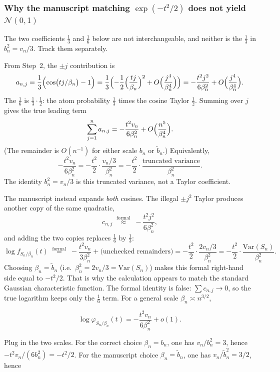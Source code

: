 \documentclass[11pt,a4paper]{article}
\begin{document}
\subsubsection{Why the manuscript matching \(\exp(-t^{2}/2)\) does not yield \(\mathcal{N}(0,1)\)}

The two coefficients \(\frac13\) and \(\frac16\) below are not interchangeable, and neither is the \(\frac13\) in \(b_{n}^{2}=v_{n}/3\). Track them separately.

From Step~2, the \(\pm j\) contribution is
\[
a_{n,j}
=
\frac13\Bigl(\cos\bigl(tj/\beta_{n}\bigr)-1\Bigr)
=
\frac13\Bigl(-\frac12\Bigl(\frac{tj}{\beta_{n}}\Bigr)^{2}+O\Bigl(\frac{j^{4}}{\beta_{n}^{4}}\Bigr)\Bigr)
=
-\frac{t^{2}j^{2}}{6\beta_{n}^{2}}
+
O\Bigl(\frac{j^{4}}{\beta_{n}^{4}}\Bigr).
\]
The \(\frac16\) is \(\frac13\cdot\frac12\): the atom probability \(\frac13\) times the cosine Taylor \(\frac12\). Summing over \(j\) gives the true leading term
\[
\sum_{j=1}^{n}a_{n,j}
=
-\frac{t^{2}v_{n}}{6\beta_{n}^{2}}
+
O\Bigl(\frac{n^{5}}{\beta_{n}^{4}}\Bigr).
\]
(The remainder is \(O(n^{-1})\) for either scale \(b_{n}\) or \(\tilde{b}_{n}\).) Equivalently,
\[
-\frac{t^{2}v_{n}}{6\beta_{n}^{2}}
=
-\frac{t^{2}}{2}\cdot\frac{v_{n}/3}{\beta_{n}^{2}}
=
-\frac{t^{2}}{2}\cdot\frac{\text{truncated variance}}{\beta_{n}^{2}}.
\]
The identity \(b_{n}^{2}=v_{n}/3\) is this truncated variance, not a Taylor coefficient.

The manuscript instead expands \emph{both} cosines. The illegal \(\pm j^{2}\) Taylor produces another copy of the same quadratic,
\[
c_{n,j}
\;\stackrel{\mathrm{formal}}{\approx}\;
-\frac{t^{2}j^{2}}{6\beta_{n}^{2}},
\]
and adding the two copies replaces \(\frac16\) by \(\frac13\):
\[
\log f_{S_{n}/\beta_{n}}(t)
\;\stackrel{\mathrm{formal}}{=}\;
-\frac{t^{2}v_{n}}{3\beta_{n}^{2}}
+
\text{(unchecked remainders)}
=
-\frac{t^{2}}{2}\cdot\frac{2v_{n}/3}{\beta_{n}^{2}}
=
-\frac{t^{2}}{2}\cdot\frac{\mathrm{Var}(S_{n})}{\beta_{n}^{2}}.
\]
Choosing \(\beta_{n}=\tilde{b}_{n}\) (i.e.\ \(\beta_{n}^{2}=2v_{n}/3=\mathrm{Var}(S_{n})\)) makes this formal right-hand side equal to \(-t^{2}/2\). That is why the calculation appears to match the standard Gaussian characteristic function. The formal identity is false: \(\sum c_{n,j}\to 0\), so the true logarithm keeps only the \(\frac16\) term. For a general scale \(\beta_{n}\asymp n^{3/2}\),

\[
\log\varphi_{S_{n}/\beta_{n}}(t)
=
-\frac{t^{2}v_{n}}{6\beta_{n}^{2}}
+
o(1).
\]

Plug in the two scales. For the correct choice \(\beta_{n}=b_{n}\), one has \(v_{n}/b_{n}^{2}=3\), hence \(-t^{2}v_{n}/(6b_{n}^{2})=-t^{2}/2\). For the manuscript choice \(\beta_{n}=\tilde{b}_{n}\), one has \(v_{n}/\tilde{b}_{n}^{2}=3/2\), hence
\end{document}
